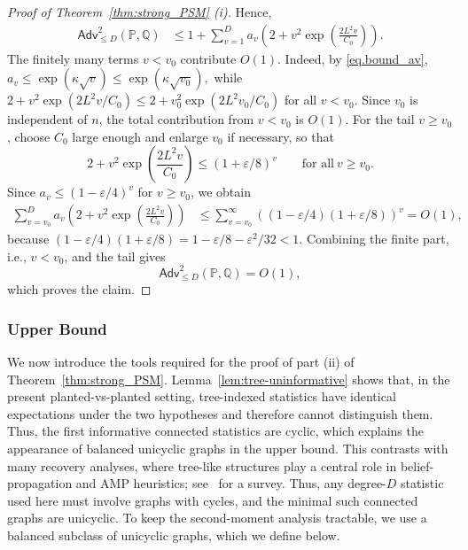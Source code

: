 \documentclass[11pt, letterpaper]{article}
\numberwithin{equation}{section}
\newcommand{\Adv}{\mathsf{Adv}}
\newcommand{\PP}{\mathbb{P}}
\newcommand{\QQ}{\mathbb{Q}}
\begin{document}
\begin{proof}[Proof of Theorem~\ref{thm:strong_PSM} \textnormal{(i)}]
Hence, 
\begin{align*}
\Adv_{\leq D}^2(\PP,\QQ)& \le 1+\sum_{v=1}^D a_v \left(2+v^2\exp \left(\frac{2L^2v}{C_0}\right)\right).
\end{align*}
The finitely many terms $v<v_0$ contribute $O(1)$. Indeed, by
\eqref{eq.bound_av},
$a_v\le \exp(\kappa\sqrt v)\le \exp(\kappa\sqrt{v_0}),$ while $2+v^2\exp(2L^2v/C_0)
\le 2+v_0^2\exp(2L^2v_0/C_0)$ for all $v<v_0$. Since $v_0$ is independent of $n$, the total contribution
from $v<v_0$ is $O(1)$. For the tail $v\ge v_0$, choose $C_0$ large enough and enlarge $v_0$ if necessary, so that 
\[
2+v^2\exp \left(\frac{2L^2v}{C_0}\right) \le \left(1+\varepsilon/8\right)^v \qquad \text{for all} \ v \ge v_0.
\]
Since $a_v \le (1-\varepsilon/4)^v$ for $v \ge v_0$, we obtain
\begin{align*}
    \sum_{v=v_0}^D a_v \left(2+v^2\exp \left(\frac{2L^2v}{C_0}\right)\right) & \le \sum_{v=v_0}^\infty \left((1-\varepsilon/4)(1+\varepsilon/8)\right)^v=O(1),
\end{align*}
because $(1-\varepsilon/4)(1+\varepsilon/8)=1-\varepsilon/8-\varepsilon^2/32<1$.
Combining the finite part, i.e., $v<v_0$, and the tail gives
\[
\Adv_{\leq D}^2(\PP,\QQ)=O(1),
\]
which proves the claim.
\end{proof}


\subsubsection{Upper Bound}\label{sec:upperbound_PSM}
We now introduce the tools required for the proof of part (ii) of Theorem~\ref{thm:strong_PSM}. Lemma~\ref{lem:tree-uninformative} shows that, in the present planted-vs-planted setting, tree-indexed statistics have identical expectations under the two hypotheses and therefore cannot distinguish them. Thus, the first informative connected statistics are cyclic, which explains the appearance of balanced unicyclic graphs in the upper bound. This contrasts with many recovery analyses, where tree-like structures play a central role in belief-propagation and AMP heuristics; see~\cite{wein2025computational} for a survey. Thus, any degree-$D$ statistic used here must involve graphs with cycles, and the minimal such connected graphs are unicyclic. To keep the second-moment analysis tractable, we use a balanced subclass of unicyclic graphs, which we define below.
\end{document}
